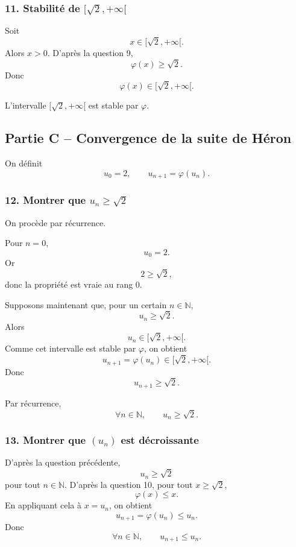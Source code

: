 \documentclass[11pt,a4paper]{article}
\newcommand{\N}{\mathbb{N}}
\begin{document}

\subsubsection*{11. Stabilité de \([\sqrt2,+\infty[\)}

Soit
\[
x\in[\sqrt2,+\infty[.
\]
Alors \(x>0\). D'après la question 9,
\[
\varphi(x)\geq\sqrt2.
\]
Donc
\[
\varphi(x)\in[\sqrt2,+\infty[.
\]

\begin{resultatbox}
L'intervalle \([\sqrt2,+\infty[\) est stable par \(\varphi\).
\end{resultatbox}


\subsection*{Partie C -- Convergence de la suite de Héron}

On définit
\[
u_0=2,
\qquad
u_{n+1}=\varphi(u_n).
\]


\subsubsection*{12. Montrer que \(u_n\geq\sqrt2\)}

On procède par récurrence.

Pour \(n=0\),
\[
u_0=2.
\]
Or
\[
2\geq\sqrt2,
\]
donc la propriété est vraie au rang \(0\).

Supposons maintenant que, pour un certain \(n\in\N\),
\[
u_n\geq\sqrt2.
\]
Alors
\[
u_n\in[\sqrt2,+\infty[.
\]
Comme cet intervalle est stable par \(\varphi\), on obtient
\[
u_{n+1}=\varphi(u_n)\in[\sqrt2,+\infty[.
\]
Donc
\[
u_{n+1}\geq\sqrt2.
\]

Par récurrence,
\[
\forall n\in\N,\qquad u_n\geq\sqrt2.
\]


\subsubsection*{13. Montrer que \((u_n)\) est décroissante}

D'après la question précédente,
\[
u_n\geq\sqrt2
\]
pour tout \(n\in\N\). D'après la question 10, pour tout \(x\geq\sqrt2\),
\[
\varphi(x)\leq x.
\]
En appliquant cela à \(x=u_n\), on obtient
\[
u_{n+1}=\varphi(u_n)\leq u_n.
\]
Donc
\[
\forall n\in\N,\qquad u_{n+1}\leq u_n.
\]
\end{document}
